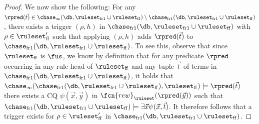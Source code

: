 \begin{proof}
We now show the following: For any $\rpred(\vec{t}) \in \chase_{\infty}(\db,\ruleset_{\smash{\mathrm{fr1}}} \cup \ruleset_{\smash{\mathrm{ff}}}) \setminus \chase_{\smash{\mathrm{fr1}}}(\db,\ruleset_{\smash{\mathrm{fr1}}} \cup \ruleset_{\smash{\mathrm{ff}}})$, there exists a trigger $(\rho,h)$ in $\chase_{\smash{\mathrm{fr1}}}(\db,\ruleset_{\smash{\mathrm{fr1}}} \cup \ruleset_{\smash{\mathrm{ff}}})$ with $\rho \in \ruleset_{\smash{\mathrm{ff}}}'$ such that applying $(\rho,h)$ adds $\rpred(\vec{t})$ to $\chase_{\smash{\mathrm{fr1}}}(\db,\ruleset_{\smash{\mathrm{fr1}}} \cup \ruleset_{\smash{\mathrm{ff}}})$. To see this, observe that since $\ruleset_{\smash{\mathrm{ff}}}$ is $\fus$, we know by definition that for any predicate $\rpred$ occurring in any rule head of $\ruleset_{\smash{\mathrm{ff}}}$ and any tuple $\vec{t}$ of terms in $\chase_{\smash{\mathrm{fr1}}}(\db,\ruleset_{\smash{\mathrm{fr1}}} \cup \ruleset_{\smash{\mathrm{ff}}})$, it holds that   $\chase_{\infty}(\chase_{\smash{\mathrm{fr1}}}(\db,\ruleset_{\smash{\mathrm{fr1}}} \cup \ruleset_{\smash{\mathrm{ff}}}), \ruleset_{\smash{\mathrm{ff}}}) \models \rpred(\vec{t})$ \iffi there exists a CQ $\psi(\vec{x},\vec{y})$ in $\fcn{rew}_{\ruleset}(\rpred(\vec{y}))$ such that $\chase_{\smash{\mathrm{fr1}}}(\db,\ruleset_{\smash{\mathrm{fr1}}} \cup \ruleset_{\smash{\mathrm{ff}}}) \models \exists \vec{x} \psi(\vec{x},\vec{t})$. It therefore follows that a trigger exists for $\rho \in \ruleset_{\smash{\mathrm{ff}}}'$ in $\chase_{\smash{\mathrm{fr1}}}(\db,\ruleset_{\smash{\mathrm{fr1}}} \cup \ruleset_{\smash{\mathrm{ff}}})$.


\end{proof}
